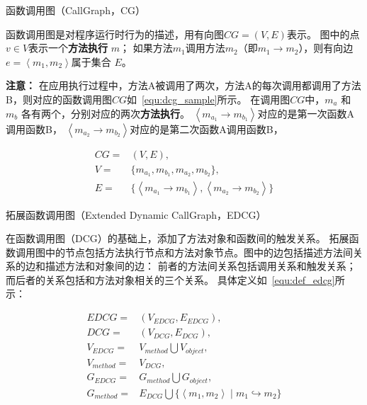 \begin{myDef}
	函数调用图（CallGraph，CG）
\end{myDef}	
	函数调用图是对程序运行时行为的描述，用有向图$CG = ( V , E)$表示。 图中的点$ v \in V $表示一个\textbf{方法执行} $m$；
	如果方法$m_1$调用方法$m_2$（即$m_1 \to m_2$），则有向边 $e = \left\langle m_1 ,m_2 \right\rangle $属于集合 $E$。 


\textbf{注意：}
在应用执行过程中，方法A被调用了两次，方法A的每次调用都调用了方法B，则对应的函数调用图$CG$如~\autoref{equ:dcg_sample}所示。
在调用图$CG$中，$m_a$ 和 $m_b$ 各有两个，分别对应的两次\textbf{方法执行}。
$\left\langle m_{a_{1}} \to m_{b_{1}}\right\rangle $对应的是第一次函数A调用函数B，
$\left\langle m_{a_{2}} \to m_{b_{2}} \right\rangle    $对应的是第二次函数A调用函数B，

\begin{equation}
\begin{aligned}
CG = &(V,E) ,\\ 
V = & \{m_{a_{1}},m_{b_{1}},m_{a_{2}},m_{b_{2}}\}, \\ 
E = & \{  
\left\langle  m_{a_{1}} \to m_{b_{1}} \right\rangle  ,\left\langle  m_{a_{2}} \to m_{b_{2}}\right\rangle 
\} 
\end{aligned}
\label{equ:dcg_sample} 
\end{equation}



\begin{myDef}
	拓展函数调用图（Extended Dynamic CallGraph，EDCG）
\end{myDef}
	在函数调用图（DCG）的基础上，添加了方法对象和函数间的触发关系。
	拓展函数调用图中的节点包括方法执行节点和方法对象节点。图中的边包括描述方法间关系的边和描述方法和对象间的边：
	前者的方法间关系包括调用关系和触发关系；而后者的关系包括和方法对象相关的三个关系。
	具体定义如~\autoref{equ:def_edcg}所示：
	
	\begin{equation}
	\begin{aligned}
	EDCG =              & (V_{EDCG},E_{EDCG}) ,\\ 
	DCG =                & (V_{DCG},E_{DCG}) ,\\ 
	V_{EDCG} =      & V_{method} \bigcup V_{object} ,\\
	V_{method} =   & V_{DCG}, \\ 
	G_{EDCG} =      & G_{method} \bigcup G_{object} , \\
	G_{method} =  & E_{DCG} \bigcup \{ \left\langle m_1 , m_2 \right\rangle  \mid m_1 \hookrightarrow m_2 \}
	\end{aligned}
	\label{equ:def_edcg} 
	\end{equation}
	
